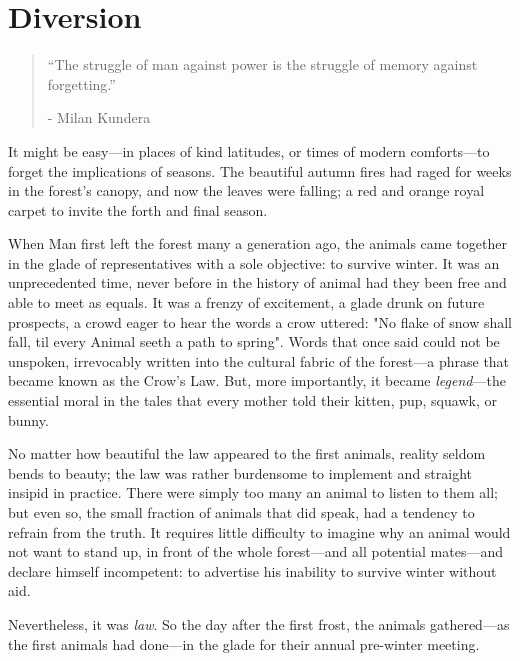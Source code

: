 \chapter{Diversion}

\vspace{-1.3cm}
\begin{localsize}{10}
	\begin{quote}
		“The struggle of man against power is the struggle of memory against forgetting.”
		\begin{flushright}- Milan Kundera \end{flushright}
	\end{quote} 
\end{localsize}
\vspace{1cm}

It might be easy---in places of kind latitudes, or times of modern comforts---to forget the implications of seasons. The beautiful autumn fires had raged for weeks in the forest's canopy, and now the leaves were falling; a red and orange royal carpet to invite the forth and final season.

When Man first left the forest many a generation ago, the animals came together in the glade of representatives with a sole objective: to survive winter. It was an unprecedented time, never before in the history of animal had they been free and able to meet as equals. It was a frenzy of excitement, a glade drunk on future prospects, a crowd eager to hear the words a crow uttered: "No flake of snow shall fall, til every Animal seeth a path to spring". Words that once said could not be unspoken, irrevocably written into the cultural fabric of the forest---a phrase that became known as the Crow's Law. But, more importantly, it became \textit{legend}---the essential moral in the tales that every mother told their kitten, pup, squawk, or bunny.

No matter how beautiful the law appeared to the first animals, reality seldom bends to beauty; the law was rather burdensome to implement and straight insipid in practice. There were simply too many an animal to listen to them all; but even so, the small fraction of animals that did speak, had a tendency to refrain from the truth. It requires little difficulty to imagine why an animal would not want to stand up, in front of the whole forest---and all potential mates---and declare himself incompetent: to advertise his inability to survive winter without aid.

Nevertheless, it was \textit{law}. So the day after the first frost, the animals gathered---as the first animals had done---in the glade for their annual pre-winter meeting.\\


